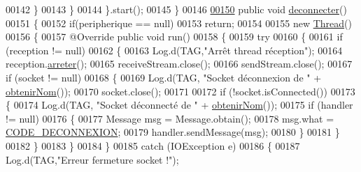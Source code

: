\begin{DoxyCode}
00142                 \}
00143             \}
00144         \}.start();
00145     \}
00146 
\hyperlink{classcom_1_1example_1_1ekawa_1_1_peripherique_aadfd24f4d783a7834c044041c7c035bb}{00150}     \textcolor{keyword}{public} \textcolor{keywordtype}{void} \hyperlink{classcom_1_1example_1_1ekawa_1_1_peripherique_aadfd24f4d783a7834c044041c7c035bb}{deconnecter}()
00151     \{
00152         \textcolor{keywordflow}{if}(peripherique == null)
00153             \textcolor{keywordflow}{return};
00154 
00155         \textcolor{keyword}{new} \hyperlink{class_thread}{Thread}()
00156         \{
00157             @Override \textcolor{keyword}{public} \textcolor{keywordtype}{void} run()
00158             \{
00159             \textcolor{keywordflow}{try}
00160             \{
00161                 \textcolor{keywordflow}{if} (reception != null)
00162                 \{
00163                     Log.d(TAG,\textcolor{stringliteral}{"Arrêt thread réception"});
00164                     reception.\hyperlink{classcom_1_1example_1_1ekawa_1_1_reception_a844c65410aaeee936f6b0d44f9df56db}{arreter}();
00165                     receiveStream.close();
00166                     sendStream.close();
00167                     \textcolor{keywordflow}{if} (socket != null)
00168                     \{
00169                         Log.d(TAG, \textcolor{stringliteral}{"Socket déconnexion de "} + \hyperlink{classcom_1_1example_1_1ekawa_1_1_peripherique_ad54cfafe03dfcf18cbd9b20602c4d86e}{obtenirNom}());
00170                         socket.close();
00171 
00172                         \textcolor{keywordflow}{if} (!socket.isConnected())
00173                         \{
00174                             Log.d(TAG, \textcolor{stringliteral}{"Socket déconnecté de "} + \hyperlink{classcom_1_1example_1_1ekawa_1_1_peripherique_ad54cfafe03dfcf18cbd9b20602c4d86e}{obtenirNom}());
00175                             \textcolor{keywordflow}{if} (handler != null)
00176                             \{
00177                                 Message msg = Message.obtain();
00178                                 msg.what = \hyperlink{classcom_1_1example_1_1ekawa_1_1_peripherique_a99f0e30a113d64b30598c6305657dcee}{CODE\_DECONNEXION};
00179                                 handler.sendMessage(msg);
00180                             \}
00181                         \}
00182                     \}
00183                 \}
00184             \}
00185             \textcolor{keywordflow}{catch} (IOException e)
00186             \{
00187                 Log.d(TAG,\textcolor{stringliteral}{"Erreur fermeture socket !"});

\end{DoxyCode}
